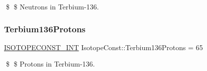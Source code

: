 \$ \$ Neutrons in Terbium-\/136. \mbox{\label{group___isotope_const-_terbium-_tb136_ga49fa31239de2c31b309eb405c59826f4}} 
\subsubsection{\texorpdfstring{Terbium136\+Protons}{Terbium136Protons}}
{\footnotesize\ttfamily \mbox{\hyperlink{group___isotope_const-_macros_ga5f18360b3e99483a35c32d789e62621c}{I\+S\+O\+T\+O\+P\+E\+C\+O\+N\+S\+T\+\_\+\+I\+NT}} Isotope\+Const\+::\+Terbium136\+Protons = 65}

\$ \$ Protons in Terbium-\/136. 